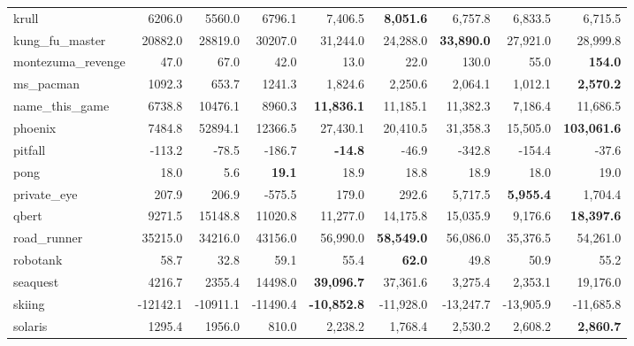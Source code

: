 \documentclass[letterpaper]{article} %
\begin{document}
\begin{table*}[t]
{\begin{tabular}{l|rrrrrrrr}
             krull &    6206.0 &    5560.0 &    6796.1 &     7,406.5 &  {\bf   8,051.6 }&        6,757.8 &    6,833.5 &    6,715.5 \\
    kung\_fu\_master &   20882.0 &   28819.0 &   30207.0 &    31,244.0 &   24,288.0 &     {\bf   33,890.0 }&   27,921.0 &   28,999.8 \\
 montezuma\_revenge &      47.0 &      67.0 &      42.0 &        13.0 &       22.0 &          130.0 &       55.0 &    {\bf   154.0 }\\
         ms\_pacman &    1092.3 &     653.7 &    1241.3 &     1,824.6 &    2,250.6 &        2,064.1 &    1,012.1 &   {\bf  2,570.2 }\\
    name\_this\_game &    6738.8 &   10476.1 &    8960.3 &   {\bf  11,836.1} &   11,185.1 &       11,382.3 &    7,186.4 &   11,686.5 \\
           phoenix &    7484.8 &   52894.1 &   12366.5 &    27,430.1 &   20,410.5 &       31,358.3 &   15,505.0 &  {\bf 103,061.6 }\\
           pitfall &    -113.2 &     -78.5 &    -186.7 &     {\bf   -14.8} &      -46.9 &         -342.8 &     -154.4 &      -37.6 \\
              pong &      18.0 &       5.6 &     {\bf  19.1} &        18.9 &       18.8 &           18.9 &       18.0 &       19.0 \\
       private\_eye &     207.9 &     206.9 &    -575.5 &       179.0 &      292.6 &        5,717.5 &   {\bf  5,955.4} &    1,704.4 \\
             qbert &    9271.5 &   15148.8 &   11020.8 &    11,277.0 &   14,175.8 &       15,035.9 &    9,176.6 &  {\bf  18,397.6 }\\
       road\_runner &   35215.0 &   34216.0 &   43156.0 &    56,990.0 &  {\bf  58,549.0 }&       56,086.0 &   35,376.5 &   54,261.0 \\
          robotank &      58.7 &      32.8 &      59.1 &        55.4 &      {\bf  62.0 }&           49.8 &       50.9 &       55.2 \\
          seaquest &    4216.7 &    2355.4 &   14498.0 &   {\bf  39,096.7} &   37,361.6 &        3,275.4 &    2,353.1 &   19,176.0 \\
            skiing &  -12142.1 &  -10911.1 &  -11490.4 &  {\bf  -10,852.8} &  -11,928.0 &      -13,247.7 &  -13,905.9 &  -11,685.8 \\
           solaris &    1295.4 &    1956.0 &     810.0 &     2,238.2 &    1,768.4 &        2,530.2 &    2,608.2 &    {\bf 2,860.7} \\

\end{tabular}}
\end{table*}
\end{document}

